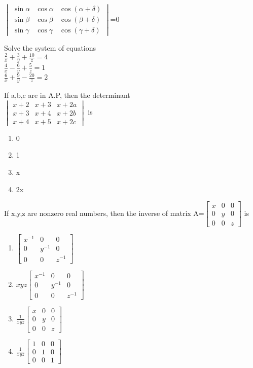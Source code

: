 \item $\begin{vmatrix}\sin\alpha&\cos\alpha&\cos(\alpha+\delta) \\ \sin\beta&\cos\beta&\cos(\beta+\delta) \\ \sin\gamma&\cos\gamma&\cos(\gamma+\delta)\end{vmatrix}$=0\\
\item Solve the system of equations \\$\frac{2}{x}+\frac{3}{y}+\frac{10}{z}=4$\\$\frac{4}{x}-\frac{6}{y}+\frac{5}{z}=1$\\$\frac{6}{x}+\frac{9}{y}-\frac{20}{z}=2$\\
\item If a,b,c are in A.P, then the determinant\\
 $\begin{vmatrix}
x+2&x+3&x+2a \\ x+3&x+4&x+2b \\x+4&x+5&x+2c
\end{vmatrix}$ is 
\begin{enumerate}
\item 0
\item 1
\item x
\item 2x
\end{enumerate}
\item If x,y,z are nonzero real numbers, then the inverse of matrix 
A=$\begin{bmatrix}
x&0&0 \\ 0&y&0 \\ 0&0&z
\end{bmatrix}$ is 
\begin{enumerate}
\item $\begin{bmatrix} x^{-1}&0&0 \\ 0&y^{-1}&0 \\ 0&0&z^{-1} \end{bmatrix}$ 
\item $xyz\begin{bmatrix} x^{-1}&0&0 \\ 0&y^{-1}&0 \\ 0&0&z^{-1} \end{bmatrix}$ 
\item $\frac{1}{xyz}\begin{bmatrix} x&0&0 \\ 0&y&0 \\ 0&0&z \end{bmatrix}$ 
\item $\frac{1}{xyz}\begin{bmatrix} 1&0&0 \\ 0&1&0 \\ 0&0&1 \end{bmatrix}$ 
\end{enumerate}
